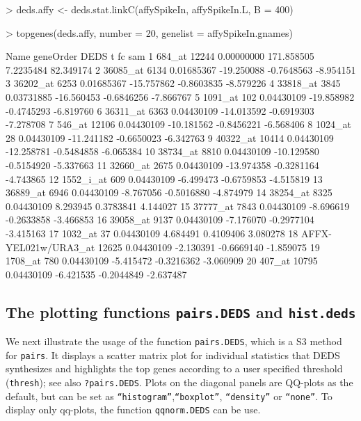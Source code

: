 \documentclass[11pt]{article}
\newcommand{\code}[1]{{\tt #1}}
\newcommand{\Rfunc}[1]{{\tt #1}}
\begin{document}
\begin{Schunk}
\begin{Sinput}
> deds.affy <- deds.stat.linkC(affySpikeIn, affySpikeIn.L, B = 400)
\end{Sinput}
\end{Schunk}

\begin{Schunk}
\begin{Sinput}
> topgenes(deds.affy, number = 20, genelist = affySpikeIn.gnames)
\end{Sinput}
\begin{Soutput}
                   Name geneOrder       DEDS          t         fc       sam
1                684_at     12244 0.00000000 171.858505  7.2235484 82.349174
2              36085_at      6134 0.01685367 -19.250088 -0.7648563 -8.954151
3              36202_at      6253 0.01685367 -15.757862 -0.8603835 -8.579226
4              33818_at      3845 0.03731885 -16.560453 -0.6846256 -7.866767
5               1091_at       102 0.04430109 -19.858982 -0.4745293 -6.819760
6              36311_at      6363 0.04430109 -14.013592 -0.6919303 -7.278708
7                546_at     12106 0.04430109 -10.181562 -0.8456221 -6.568406
8               1024_at        28 0.04430109 -11.241182 -0.6650023 -6.342763
9              40322_at     10414 0.04430109 -12.258781 -0.5484858 -6.065384
10             38734_at      8810 0.04430109 -10.129580 -0.5154920 -5.337663
11             32660_at      2675 0.04430109 -13.974358 -0.3281164 -4.743865
12            1552_i_at       609 0.04430109  -6.499473 -0.6759853 -4.515819
13             36889_at      6946 0.04430109  -8.767056 -0.5016880 -4.874979
14             38254_at      8325 0.04430109   8.293945  0.3783841  4.144027
15             37777_at      7843 0.04430109  -8.696619 -0.2633858 -3.466853
16             39058_at      9137 0.04430109  -7.176070 -0.2977104 -3.415163
17              1032_at        37 0.04430109   4.684491  0.4109406  3.080278
18 AFFX-YEL021w/URA3_at     12625 0.04430109  -2.130391 -0.6669140 -1.859075
19              1708_at       780 0.04430109  -5.415472 -0.3216362 -3.060909
20               407_at     10795 0.04430109  -6.421535 -0.2044849 -2.637487
\end{Soutput}
\end{Schunk}

\subsection{The plotting functions \Rfunc{pairs.DEDS} and \Rfunc{hist.deds}}
We next illustrate the usage of the function \code{pairs.DEDS}, which is 
a S3 method for \code{pairs}. It displays a scatter matrix plot for 
individual statistics that DEDS synthesizes and highlights the top genes
according to a user specified threshold (\code{thresh}); see also
\code{?pairs.DEDS}. Plots on the diagonal panels are QQ-plots as the
default, but can be set as \code{``histogram''},\code{``boxplot''}, 
\code{``density''} or \code{``none''}. To display only qq-plots, the function 
\code{qqnorm.DEDS} can be use.
\end{document}
